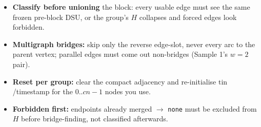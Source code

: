 \begin{hardeningbox}
\begin{itemize}[nosep,leftmargin=1.4em]
\item \textbf{Classify before unioning} the block: every usable edge must see the
      same frozen pre-block DSU, or the group's \(H\) collapses and forced edges look
      forbidden.
\item \textbf{Multigraph bridges:} skip only the reverse edge-slot, never every arc
      to the parent vertex; parallel edges must come out non-bridges (Sample 1's
      \(w{=}2\) pair).
\item \textbf{Reset per group:} clear the compact adjacency and re-initialise
      \(\mathrm{tin}\)/timestamp for the \(0..cn{-}1\) nodes you use.
\item \textbf{Forbidden first:} endpoints already merged \(\to\) \texttt{none}
      must be excluded from \(H\) before bridge-finding, not classified afterwards.
\end{itemize}
\end{hardeningbox}

\begin{recallbox}
\end{recallbox}

